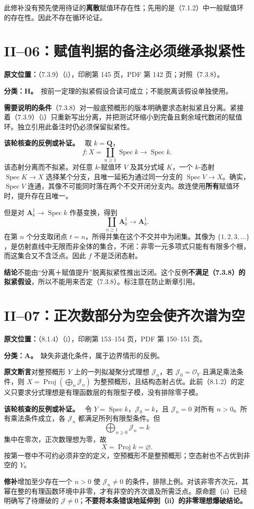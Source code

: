 \documentclass[UTF8,a4paper]{ctexbook}
\newcommand{\OO}{\mathscr O}
\DeclareMathOperator{\Spec}{Spec}
\DeclareMathOperator{\Proj}{Proj}
\newcommand{\JJ}{\mathcal J}
\newcommand{\oldauditsrc}[1]{\par\noindent\textbf{原文位置：}#1。\par}
\newcommand{\kind}[2]{\noindent\textbf{分类：#1。}\ #2\par}
\newcommand{\lead}[1]{\par\noindent\textbf{#1}\quad}
\newenvironment{analysisproof}{\par\noindent\textbf{该轮核查的反例或补证。}\ }{\par}
\begin{document}
此修补没有预先使用待证的\textbf{离散}赋值环存在性；先用的是（7.1.2）中一般赋值环的存在性。因此不存在循环论证。

\section{II--06：赋值判据的备注必须继承拟紧性}
\oldauditsrc{（7.3.9）（i），印刷第 145 页，PDF 第 142 页；对照（7.3.8）}
\kind{H}{按前一定理的拟紧假设合读可成立；不能脱离该假设单独使用。}
\lead{需要说明的条件}（7.3.8）对一般底预概形的版本明确要求态射拟紧且分离。紧接着（7.3.9）（i）只重新写出分离，并把测试环缩小到完备且剩余域代数闭的赋值环。独立引用此备注时仍必须保留拟紧性。
\begin{analysisproof}
取 $k=\mathbf Q$，
\[
f:X=\coprod_{n\ge1}\Spec k\longrightarrow\Spec k.
\]
该态射分离而不拟紧。对任意 $k$-赋值环 $V$ 及其分式域 $K$，一个 $k$-态射 $\Spec K\to X$ 选择某个分支，且唯一延拓为通过同一分支的 $\Spec V\to X$。确实，$\Spec V$ 连通，其像不可能同时落在两个不交开闭分支内。故连使用\textbf{所有}赋值环时，提升存在且唯一。

但是对 $\mathbf A^1_k\to\Spec k$ 作基变换，得到
\[
\coprod_{n\ge1}\mathbf A^1_k\longrightarrow\mathbf A^1_k.
\]
在第 $n$ 个分支取闭点 $t=n$，所得并集在这个不交并中为闭集。其像为 $\{1,2,3,\ldots\}$，是仿射直线中无限而非全体的集合，不闭：非零一元多项式只能有有限多个根，而这集合又不含泛点。因此 $f$ 不是泛闭态射。
\end{analysisproof}
\lead{结论}不能由“分离＋赋值提升”脱离拟紧性推出泛闭。这个反例\textbf{不满足（7.3.8）的拟紧假设}，所以不能用来否定（7.3.8）。标注意在防止断章引用。

\section{II--07：正次数部分为空会使齐次谱为空}
\oldauditsrc{（8.1.4）（i），印刷第 153--154 页，PDF 第 150--151 页}
\kind{A}{缺失非退化条件，属于边界情形的反例。}
\lead{原文断言}对整预概形 $Y$ 上的一列拟凝聚分式理想 $\JJ_n$，若 $\JJ_0=\OO_Y$ 且满足乘法条件，则 $X=\Proj(\bigoplus_n\JJ_n)$ 为整预概形，且结构态射占优。此前（8.1.2）的定义只要求分式理想是有理函数层的有限型子模，没有排除零子模。
\begin{analysisproof}
令 $Y=\Spec k$，$\JJ_0=k$，且 $\JJ_n=0$ 对所有 $n>0$。所有乘法条件成立，各 $\JJ_n$ 都满足所列有限型条件。但
\[
\bigoplus_{n\ge0}\JJ_n=k
\]
集中在零次，正次数理想为零，故
\[
X=\Proj k=\varnothing.
\]
按第一卷中不可约必须非空的定义，空预概形不是整预概形；空态射也不占优到非空的 $Y$。
\end{analysisproof}
\lead{修补}增加至少存在一个 $n>0$ 使 $\JJ_n\ne0$ 的条件，排除上例。对该非零齐次元，其幂在整的有理函数环境中非零，才有非空的齐次谱及所需泛点。原命题（ii）已经明确写了待爆破的 $\JJ\ne0$；\textbf{不要将本条错误地延伸到（ii）的非零理想爆破结论。}
\end{document}
